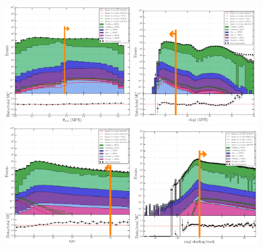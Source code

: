 \begin{figure}[ht]
\centering
\includegraphics[width=0.49\textwidth]{chapter8/img/1D_stack_mpefit_zenith.png}
\includegraphics[width=0.49\textwidth]{chapter8/img/1D_stack_mpefit_rlogl.png}
\includegraphics[width=0.49\textwidth]{chapter8/img/L3_zenithcut_gr_1p4835298642_rloglcut_less_15_1D_stack_npe.png}
\includegraphics[width=0.49\textwidth]{chapter8/img/L3_zenithcut_gr_1p4835298642_rloglcut_less_15_npecut_less_50_1D_stack_finitereco_rllh_starting.png}

\end{figure}
